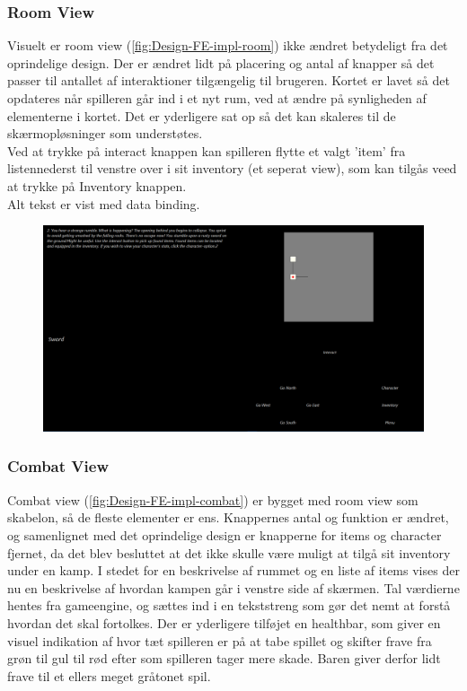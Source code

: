 \subsubsection{Room View}

Visuelt er room view (\autoref{fig:Design-FE-impl-room}) ikke ændret betydeligt fra det oprindelige design. Der er ændret lidt på placering og antal af knapper så det passer til antallet af interaktioner tilgængelig til brugeren. Kortet er lavet så det  opdateres når spilleren går ind i et nyt rum, ved at ændre på synligheden af elementerne i kortet. Det er yderligere sat op så det kan skaleres til de skærmopløsninger som understøtes.\\
Ved at trykke på interact knappen kan spilleren flytte et valgt 'item' fra listennederst til venstre over i sit inventory (et seperat view), som kan tilgås veed at trykke på Inventory knappen.\\
Alt tekst er vist med data binding.

\begin{figure}[h]
\centering
\includegraphics[width = \textwidth]{02-Body/Images/room_final.PNG}
\caption{}
\label{fig:Design-FE-impl-room}
\end{figure}

\subsubsection{Combat View}

Combat view (\autoref{fig:Design-FE-impl-combat}) er bygget med room view som skabelon, så de fleste elementer er ens. Knappernes antal og funktion er ændret, og samenlignet med det oprindelige design er knapperne for items og character fjernet, da det blev besluttet at det ikke skulle være muligt at tilgå sit inventory under en kamp. I stedet for en beskrivelse af rummet og en liste af items vises der nu en beskrivelse af hvordan kampen går i venstre side af skærmen. Tal værdierne hentes fra gameengine, og sættes ind i en tekststreng som gør det nemt at forstå hvordan det skal fortolkes. Der er yderligere tilføjet en healthbar, som giver en visuel indikation af hvor tæt spilleren er på at tabe spillet og skifter frave fra grøn til gul til rød efter som spilleren tager mere skade. Baren giver derfor lidt frave til et ellers meget gråtonet spil.


